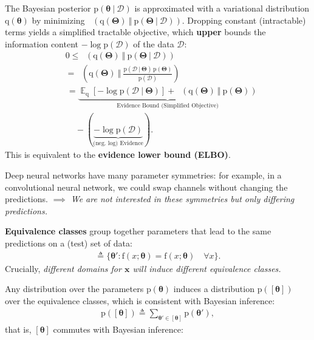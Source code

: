 \documentclass[25pt,a0paper,landscape]{tikzposter}
\DeclareMathOperator{\opExpectation}{\mathbb{E}}
\newcommand{\E}[2]{\opExpectation_{#1} \left [ #2 \right ]}
\newcommand{\MidSymbol}[1][]{\:#1\:}
\newcommand{\given}{\MidSymbol[\vert]}
\DeclareMathOperator{\opKale}{D_\mathrm{KL}}
\newcommand{\Kale}[2]{\opKale(#1 \MidSymbol[\Vert] #2)}
\newcommand{\opp}{\mathrm{p}}
\newcommand{\pof}[1]{\opp(#1)}
\newcommand{\opq}{\mathrm{q}}
\newcommand{\qof}[1]{\opq(#1)}
\newcommand{\w}{\boldsymbol{\theta}}
\newcommand{\W}{\boldsymbol{\Theta}}
\newcommand{\opf}{\mathrm{f}}
\newcommand{\fof}[1]{\opf(#1)}
\newcommand{\Dany}{\mathcal{D}}
\newcommand{\x}{\boldsymbol{x}}
\begin{document}
\begin{columns}
{\begin{multicols}{2}
\begin{backgroundbox}[title=(Regular) Variational Inference \& ELBO]
      The Bayesian posterior $\pof{\w \given \Dany}$ is approximated with a variational distribution $\qof{\w}$ by minimizing $\Kale{\qof{\W}}{\pof{\W \given \Dany}}$. Dropping constant (intractable) terms yields a simplified tractable objective, which \textbf{upper} bounds the information content $-\log \pof{\Dany}$ of the data $\Dany$:
      \begin{align*}
      & 0 \le \Kale{\qof{\W}}{\pof{\W \given \Dany}} \\
      &= \Kale{\qof{\W}}{\frac{\pof{\Dany \given \W}\,\pof{\W}}{\pof{\Dany}}}\\
      &\, = \underbrace{\E{\opq}{-\log \pof{\Dany \given \W}} + \Kale{\qof{\W}}{\pof{\W}}}_{\text{Evidence Bound (Simplified Objective)}} \\
      &\, \quad - (\underbrace{-\log \pof{\Dany}}_{\text{(neg.~log) Evidence}}).
      \end{align*}
      This is equivalent to the \textbf{evidence lower bound (ELBO)}.
    \end{backgroundbox}
    \begin{theorybox}[title=Parameter Symmetries]
      Deep neural networks have many parameter symmetries: for example, in a convolutional neural network, we could swap channels without changing the predictions.
      \emph{$\implies$ We are not interested in these symmetries but only differing predictions.}
    \end{theorybox}
    \begin{theorybox}[title=Equivalence Classes]
      \textbf{Equivalence classes} group together parameters that lead to the same predictions on a (test) set of data:
      \begin{align*}
        [\w] \triangleq \{\w' : \fof{x ; \w} = \fof{x ; \w} \quad \forall x \}.
      \end{align*}
      Crucially, \emph{different domains for $\x$ will induce different equivalence classes.}
    \end{theorybox}
    \begin{theorybox}[title=Consistency of Equivalence Classes with Bayesian Inference]
      Any distribution over the parameters $\pof{\w}$ induces a distribution $\pof{[\w]}$ over the equivalence classes, which is consistent with Bayesian inference:
      \begin{align*}
        \pof{[\w]} \triangleq \sum_{\w' \in [\w]} \pof{\w'},
      \end{align*}
      that is, $[\w]$ commutes with Bayesian inference:
      \begin{align*}

\end{align*}
\end{theorybox}
\end{multicols}}
\end{columns}
\end{document}
